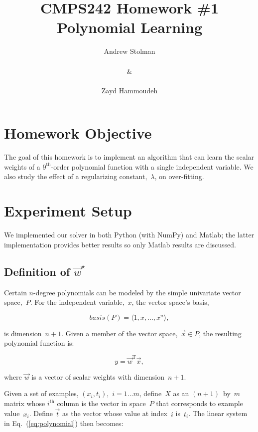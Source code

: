 \documentclass{report}
\title{\textbf{CMPS242 Homework \#1 \textendash{} Polynomial Learning}}
\author{Andrew Stolman \\~\\ \& \\~\\Zayd Hammoudeh}
\newcommand{\eref}[1]{(\ref{#1})}
\newcommand{\wstar}{\vec{w}^{\star}}
\begin{document}
  \maketitle
  
 
  \section{Homework Objective}
  
  The goal of this homework is to implement an algorithm that can learn the scalar weights of a {$9^{\text{th}}$-order} polynomial function with a single independent variable.  We also study the effect of a regularizing constant,~$\lambda$, on over-fitting.
  
  \section{Experiment Setup}
  
  We implemented our solver in both Python (with NumPy) and Matlab; the latter implementation provides better results so only Matlab results are discussed.  
  
  \subsection{Definition of $\wstar$}
  
  Certain $n$-degree polynomials can be modeled by the simple univariate vector space,~$P$.  For the independent variable,~$x$, the vector space's basis,
  
  \begin{equation}
    basis(P)=\langle 1,x,...,x^{n}\rangle,
  \end{equation}
  
  \noindent
  is dimension~$n+1$.  Given a member of the vector space,~${\vec{x} \in P}$, the resulting polynomial function is:
  
  \begin{equation}
    y=\vec{w}^{\text{T}}\vec{x},
  \end{equation}\label{eq:polynomial}
  
  \noindent
  where $\vec{w}$ is a vector of scalar weights with dimension~$n+1$.
  
  Given a set of examples, $(x_{i},t_{i})$,~$i=1...m$, define~$X$ as an $(n+1)$~by~$m$ matrix whose $i^{\text{th}}$ column is the vector in space~$P$ that corresponds to example value~$x_{i}$.  Define  $\vec{t}$ as the vector whose value at index~$i$ is~$t_{i}$.  The linear system in Eq.~\eref{eq:polynomial} then becomes:
  
\end{document}
